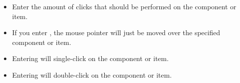 \begin{itemize}
\item Enter the amount of clicks that should be performed on the component or item.
\item If you enter , the mouse pointer will just be moved over the specified component or item.
\item Entering  will single-click on the component or item.
\item Entering  will double-click on the component or item. 
\end{itemize}



